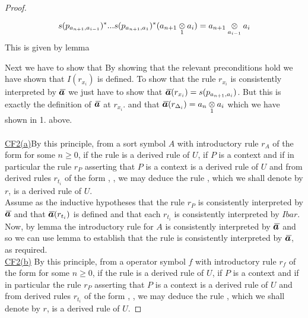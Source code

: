 \begin{proof}
\begin{enumerate}
\begin{equation*}
s(p_{a_{n+1},a_{i-1}})^*...s(p_{a_{n+1},a_1})^*(a_{n+1} \underset{1}{\otimes} a_i) = a_{n+1} \underset{a_{i-1}}{\otimes} a_i
\end{equation*}  
This is given by lemma 
\end{enumerate}
Next we have to show that 
By showing that the relevant preconditions hold we have shown that $I(r_{x_i})$ is defined. 
To show that the rule $r_{x_i}$ is consistently interpreted by $\Ibar$ we just have to show that
 $\Ibar(r_{x_i})=s(p_{a_{n+1},a_i})$. But this is exactly the definition of $\Ibar$ at $r_{x_i}$. 
and that $\Ibar(r_{\Delta_i})=\crossx{a_n}{a_i}{1}$ which we have shown in 1. above.\\
 \\
\underline{CF2(a)}By this principle, from a sort symbol $A$ with introductory rule $r_A$ of the form  for some $n \geq 0$, if the rule  is a derived rule of $U$,
if $P$ is a context and if in particular the rule $r_P$ asserting that $P$ is a context is a derived rule of $U$
and from derived rules $r_{t_i}$ of the form , \foreachi, we may deduce
the rule , which we shall denote by $r$, is a derived rule of $U$. \\

Assume as the inductive hypotheses that the rule $r_P$ is consistently interpreted by $\Ibar$ and that 
$\Ibar(r_{t_i})$ is defined \foreachi and that each $r_{t_i}$ is consistently
interpreted by $Ibar$.
Now, by lemma  the introductory rule for $A$ is consistently interpreted by $\Ibar$
and so we can use lemma 
to establish that the rule  is consistently interpreted by $\Ibar$, as required. \\
\underline{CF2(b)} By this principle, from a operator symbol $f$ with introductory rule $r_f$ of the form  for some $n \geq 0$, if the rule  is a derived rule of $U$,
if $P$ is a context and if in particular the rule $r_P$ asserting that $P$ is a context is a derived rule of $U$
and from derived rules $r_{t_i}$ of the form , \foreachi, we may deduce
the rule , which we shall denote by $r$, is a derived rule of $U$. 


\end{proof}
